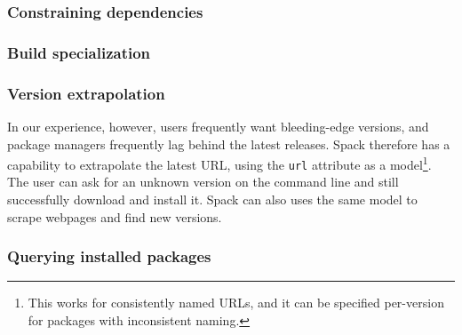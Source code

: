 \subsubsection{Constraining dependencies}


\subsubsection{Build specialization}


\subsubsection{Version extrapolation}

In our experience, however, users
frequently want bleeding-edge versions, and package managers frequently lag 
behind the latest releases.  Spack therefore has a capability to extrapolate
the latest URL, using the {\tt url} attribute as a model\footnote{This works
for consistently named URLs, and it can be specified per-version for packages
with inconsistent naming.}.
The user can ask for an unknown version on the command line and still
successfully download and install it.  Spack can also uses the same model to
scrape webpages and find new versions. 



\subsubsection{Querying installed packages}
